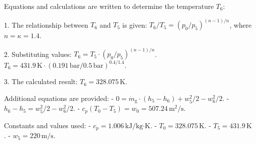 Equations and calculations are written to determine the temperature \( T_6 \):  

1. The relationship between \( T_6 \) and \( T_5 \) is given:  
   \( T_6 / T_5 = (p_0 / p_5)^{(n-1)/n} \), where \( n = \kappa = 1.4 \).  

2. Substituting values:  
   \( T_6 = T_5 \cdot (p_0 / p_5)^{(n-1)/n} \).  
   \( T_6 = 431.9 \, \text{K} \cdot (0.191 \, \text{bar} / 0.5 \, \text{bar})^{0.4/1.4} \).  

3. The calculated result:  
   \( T_6 = 328.075 \, \text{K} \).  

Additional equations are provided:  
- \( 0 = \dot{m}_{\text{g}} \cdot (h_5 - h_6) + w_5^2 / 2 - w_6^2 / 2 \).  
- \( h_6 - h_5 = w_5^2 / 2 - w_6^2 / 2 \).  
- \( c_p (T_0 - T_5) = w_0 = 507.24 \, \text{m}^2 / \text{s} \).  

Constants and values used:  
- \( c_p = 1.006 \, \text{kJ/kg·K} \).  
- \( T_0 = 328.075 \, \text{K} \).  
- \( T_5 = 431.9 \, \text{K} \).  
- \( w_5 = 220 \, \text{m/s} \).